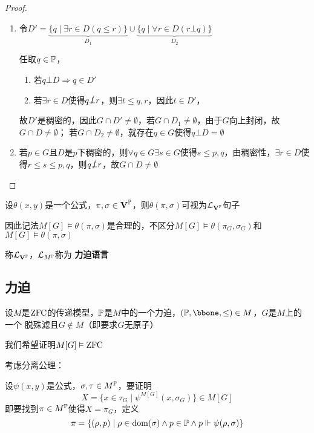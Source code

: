 \documentclass[11pt]{article}
\begin{document}
\begin{proof}
\begin{enumerate}
\item 令\(D'=\underbrace{\{q\mid\exists r\in D(q\le r)\}}_{D_1}\cup\underbrace{\{q\mid\forall r\in D(r\bot q)\}}_{D_2}\)

任取\(q\in\P\)，
\begin{enumerate}
\item 若\(q\bot D\Rightarrow q\in D'\)
\item 若\(\exists r\in D\)使得\(q\slashed{\bot} r\)，则\(\exists t\le q,r\)，因此\(t\in D'\)，
\end{enumerate}
故\(D'\)是稠密的，因此\(G\cap D'\neq\emptyset\)，若\(G\cap D_1\neq\emptyset\)，由于\(G\)向上封闭，故\(G\cap D\neq\emptyset\)；
若\(G\cap D_2\neq\emptyset\)，就存在\(q\in G\)使得\(q\bot D=\emptyset\)
\item 若\(p\in G\)且\(D\)是\(p\)下稠密的，则\(\forall q\in G\exists s\in G\)使得\(s\le p,q\)，由稠密性，\(\exists r\in D\)使
得\(r\le s\le p,q\)，则\(q\slashed{\bot}r\)，故\(G\cap D\neq\emptyset\)
\end{enumerate}
\end{proof}

设\(\theta(x,y)\)是一个公式，\(\pi,\sigma\in\bV^{\P}\)，则\(\theta(\pi,\sigma)\)可视为\(\call_{\bV^{\P}}\)句子

因此记法\(M[G]\vDash\theta(\pi,\sigma)\)是合理的，不区分\(M[G]\vDash\theta(\pi_G,\sigma_G)\)和\(M[G]\vDash\theta(\pi,\sigma)\)

称\(\call_{\bV^{\P}}\)，\(\call_{M^{\P}}\)称为 \textbf{力迫语言}
\subsection{力迫}
\label{sec:org39e0aa9}
设\(M\)是\(\ZFC\)的传递模型，\(\P\)是\(M\)中的一个力迫，\((\P,\bbone,\le)\in M\)，\(G\)是\(M\)上的一个
脱殊滤且\(G\notin M\)（即要求\(G\)无原子）

我们希望证明\(M[G]\vDash\ZFC\)

考虑分离公理：

设\(\psi(x,y)\)是公式，\(\sigma,\tau\in M^{\P}\)，要证明
\begin{equation*}
X=\{x\in\tau_G\mid\psi^{M[G]}(x,\sigma_G)\}\in M[G]
\end{equation*}
即要找到\(\pi\in M^{\P}\)使得\(X=\pi_G\)，定义
\begin{equation*}
\pi=\{(\rho,p)\mid\rho\in\dom(\sigma)\wedge p\in\P\wedge p\Vdash\psi(\rho,\sigma)\}
\end{equation*}
\end{document}
